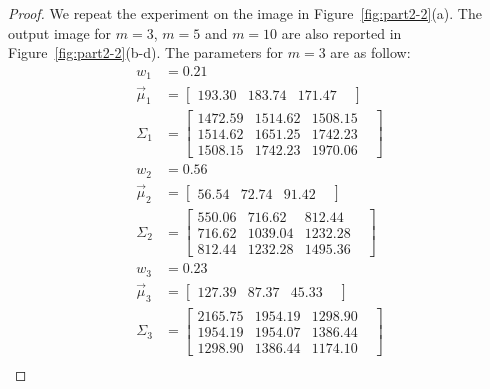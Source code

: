 \documentclass[12pt]{article}
\newcommand{\1}{\mathbf{1}}
\begin{document}
{\begin{itemize}
  \begin{proof}
    We repeat the experiment on the image in Figure~\ref{fig:part2-2}(a). The output image for $m=3$, $m=5$ and $m=10$ are also reported in Figure~\ref{fig:part2-2}(b-d). The parameters for $m=3$ are as follow:
    \begin{align*}
    w_{1} &= 0.21 \\
\vec{\mu}_{1} &= \begin{bmatrix} 193.30 &  183.74 &  171.47 &  \end{bmatrix} \\
\Sigma_{1} &= \begin{bmatrix} 1472.59 &  1514.62 &  1508.15 &  \\1514.62 &  1651.25 &  1742.23 &  \\1508.15 &  1742.23 &  1970.06 &  \end{bmatrix} \\
w_{2} &= 0.56 \\
\vec{\mu}_{2} &= \begin{bmatrix} 56.54 &  72.74 &  91.42 &  \end{bmatrix} \\
\Sigma_{2} &= \begin{bmatrix} 550.06 &  716.62 &  812.44 &  \\716.62 &  1039.04 &  1232.28 &  \\812.44 &  1232.28 &  1495.36 &  \end{bmatrix} \\
w_{3} &= 0.23 \\
\vec{\mu}_{3} &= \begin{bmatrix} 127.39 &  87.37 &  45.33 &  \end{bmatrix} \\
\Sigma_{3} &= \begin{bmatrix} 2165.75 &  1954.19 &  1298.90 &  \\1954.19 &  1954.07 &  1386.44 &  \\1298.90 &  1386.44 &  1174.10 &  \end{bmatrix} \\
\end{align*}



\end{proof}
\end{itemize}}
\end{document}
